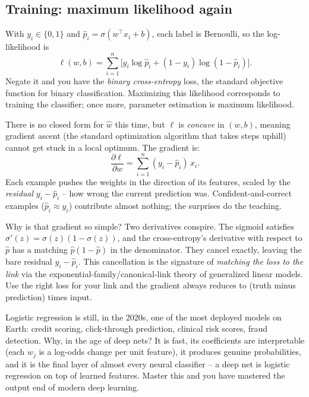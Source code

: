 \subsection{Training: maximum likelihood again}

With $y_i\in\{0,1\}$ and $\hat p_i = \sigma(w^\top x_i + b)$, each label is
Bernoulli, so the log-likelihood is
\[
  \ell(w,b) = \sum_{i=1}^n \big[y_i\log\hat p_i + (1-y_i)\log(1-\hat p_i)\big].
\]
Negate it and you have the \emph{binary cross-entropy} loss, the standard objective
function for binary classification. Maximizing this likelihood corresponds to training the
classifier; once more, parameter estimation is maximum likelihood.

There is no closed form for $\hat w$ this time, but $\ell$ is \emph{concave} in $(w,b)$, meaning gradient ascent (the standard optimization algorithm that takes steps uphill) cannot get stuck in a local optimum. The gradient is:
\[
  \frac{\partial \ell}{\partial w} = \sum_{i=1}^n (y_i - \hat p_i)\,x_i.
\]
Each example pushes the weights in the direction of its features, scaled by the
\emph{residual} $y_i - \hat p_i$ -- how wrong the current prediction was.
Confident-and-correct examples ($\hat p_i\approx y_i$) contribute almost nothing;
the surprises do the teaching.

\begin{whybox}
Why is that gradient so simple? Two derivatives conspire. The sigmoid satisfies
$\sigma'(z) = \sigma(z)(1-\sigma(z))$, and the cross-entropy's derivative with
respect to $\hat p$ has a matching $\hat p(1-\hat p)$ in the denominator. They
cancel exactly, leaving the bare residual $y_i-\hat p_i$. This cancellation is the signature of \emph{matching the loss to the link} via the
exponential-family/canonical-link theory of generalized linear models. Use the
right loss for your link and the gradient always reduces to (truth minus
prediction) times input.
\end{whybox}

\begin{applicationbox}
Logistic regression is still, in the 2020s, one of the most deployed models on
Earth: credit scoring, click-through prediction, clinical risk scores, fraud
detection. Why, in the age of deep nets? It is fast, its coefficients are
interpretable (each $w_j$ is a log-odds change per unit feature), it produces
genuine probabilities, and it is the final layer of almost every neural
classifier -- a deep net is logistic regression on top of learned features. Master
this and you have mastered the output end of modern deep learning.
\end{applicationbox}

